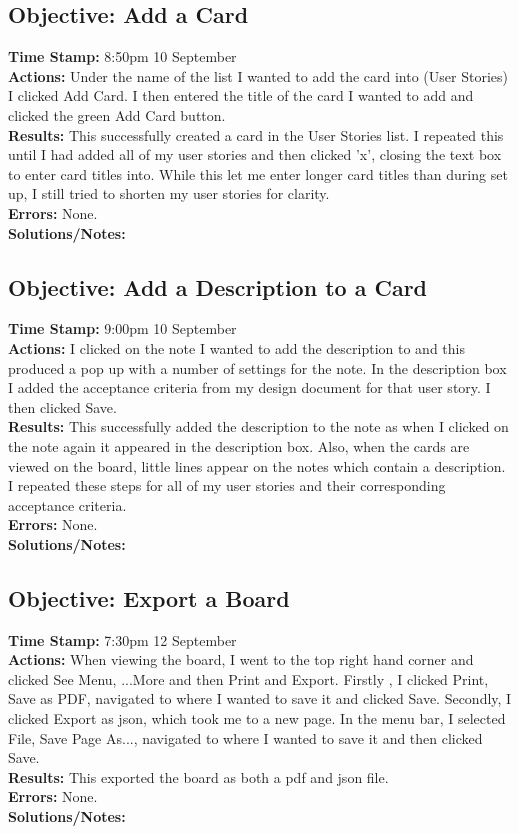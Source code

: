 \documentclass{article}
\begin{document}
\begin{FlushLeft}
\subsection{Objective: Add a Card}
\textbf{Time Stamp:} 8:50pm 10 September\\
\textbf{Actions:} Under the name of the list I wanted to add the card into (User Stories) I clicked Add Card. I then entered the title of the card I wanted to add and clicked the green Add Card button.\\
\textbf{Results:} This successfully created a card in the User Stories list. I repeated this until I had added all of my user stories and then clicked 'x', closing the text box to enter card titles into. While this let me enter longer card titles than during set up, I still tried to shorten my user stories for clarity.\\
\textbf{Errors:} None.\\
\textbf{Solutions/Notes:}\\

\subsection{Objective: Add a Description to a Card}
\textbf{Time Stamp:} 9:00pm 10 September\\
\textbf{Actions:} I clicked on the note I wanted to add the description to and this produced a pop up with a number of settings for the note. In the description box I added the acceptance criteria from my design document for that user story. I then clicked Save.\\
\textbf{Results:} This successfully added the description to the note as when I clicked on the note again it appeared in the description box. Also, when the cards are viewed on the board, little lines appear on the notes which contain a description. I repeated these steps for all of my user stories and their corresponding acceptance criteria.\\
\textbf{Errors:} None.\\
\textbf{Solutions/Notes:}\\

\subsection{Objective: Export a Board}
\textbf{Time Stamp:} 7:30pm 12 September\\
\textbf{Actions:} When viewing the board, I went to the top right hand corner and clicked See Menu, ...More and then Print and Export. Firstly , I clicked Print, Save as PDF, navigated to where I wanted to save it and clicked Save. Secondly, I clicked Export as json, which took me to a new page. In the menu bar, I selected File, Save Page As..., navigated to where I wanted to save it and then clicked Save.\\
\textbf{Results:} This exported the board as both a pdf and json file. \\
\textbf{Errors:} None.\\
\textbf{Solutions/Notes:}\\


\end{FlushLeft}
\end{document}
